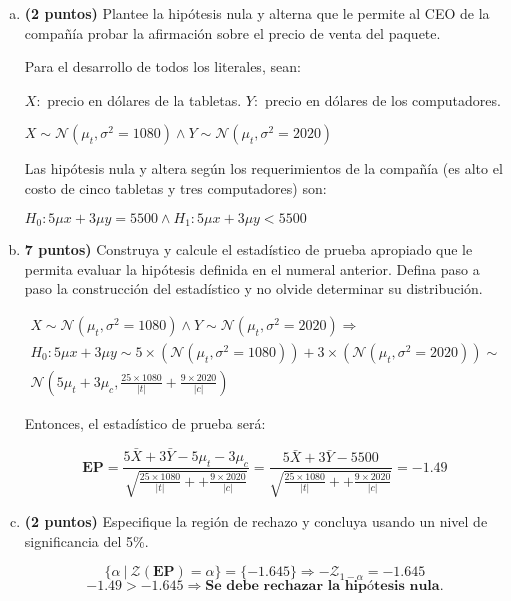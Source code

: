 \documentclass[../main.tex]{subfiles}
\begin{document}
\begin{enumerate}[(a)]

\item \textbf{(2 puntos)} Plantee la hipótesis nula y alterna que le permite al CEO de la compañía probar la afirmación sobre el precio de venta del paquete.

Para el desarrollo de todos los literales, sean:

$X: $ precio en dólares de la tabletas. $Y: $ precio en dólares de los computadores.

$X \sim \mathcal{N}(\mu_t, \sigma ^2 = 1080) \wedge Y \sim \mathcal{N}(\mu_t, \sigma ^2 = 2020)$

Las hipótesis nula y altera según los requerimientos de la compañía (es alto el costo de cinco tabletas y tres computadores) son:

$H_0: 5\mu x + 3 \mu y = 5500 \wedge H_1: 5\mu x + 3 \mu y < 5500$

\item \textbf{7 puntos)} Construya y calcule el estadístico de prueba apropiado que le permita evaluar la hipótesis definida en el numeral anterior. Defina paso a paso la construcción del estadístico y no olvide determinar su distribución.

\begin{multline}
 X \sim \mathcal{N}(\mu_t, \sigma ^2 = 1080) \wedge Y \sim \mathcal{N}(\mu_t, \sigma ^2 = 2020) \Rightarrow \\
  H_0: 5\mu x + 3 \mu y \sim 5 \times (\mathcal{N}(\mu_t, \sigma ^2 = 1080)) + 3 \times (\mathcal{N}(\mu_t, \sigma ^2 = 2020)) \sim \\
  \mathcal{N}\left(5\mu_t + 3 \mu_c, \frac{25 \times 1080}{|t|} + \frac{9 \times 2020}{|c|} \right)
\end{multline}

Entonces, el estadístico de prueba será:

$$\textbf{EP} = \frac{5\bar{X} + 3\bar{Y} - 5\mu_t - 3\mu_c}{\sqrt{\frac{25 \times 1080}{|t|} + + \frac{9 \times 2020}{|c|}}} =\frac{5\bar{X} + 3\bar{Y} - 5500}{\sqrt{\frac{25 \times 1080}{|t|} + + \frac{9 \times 2020}{|c|}}} = -1.49$$

\item \textbf{(2 puntos)} Especifique la región de rechazo y concluya usando un nivel de significancia del 5\%.

$$\{\alpha \ | \ \mathcal{Z}(\textbf{EP}) = \alpha \} = \{ -1.645\} \Rightarrow - \mathcal{Z}_{1 - \alpha} = -1.645$$
$$-1.49 > -1.645 \Rightarrow \textbf{Se debe rechazar la hipótesis nula.}$$


\end{enumerate}
\end{document}
